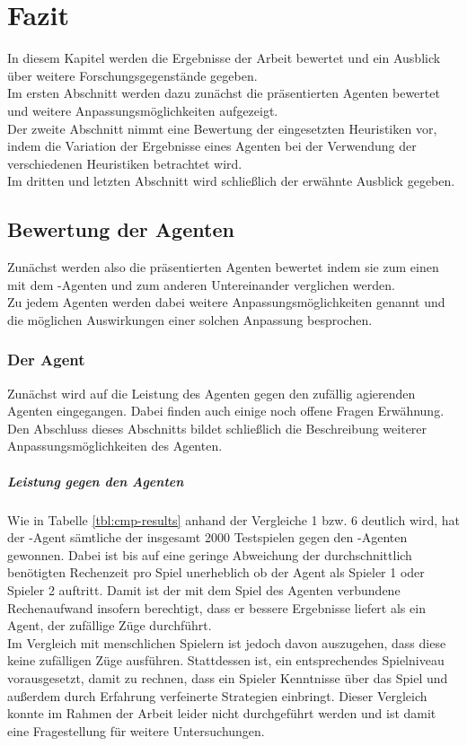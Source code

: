 \chapter{Fazit}
\label{Fazit}
\authormax
In diesem Kapitel werden die Ergebnisse der Arbeit bewertet und ein Ausblick über weitere Forschungsgegenstände gegeben.
\\Im ersten Abschnitt werden dazu zunächst die präsentierten Agenten bewertet und weitere Anpassungsmöglichkeiten aufgezeigt.
\\Der zweite Abschnitt nimmt eine Bewertung der eingesetzten Heuristiken vor, indem die Variation der Ergebnisse eines Agenten bei der Verwendung der verschiedenen Heuristiken betrachtet wird.
\\Im dritten und letzten Abschnitt wird schließlich der erwähnte Ausblick gegeben.   

\section{Bewertung der Agenten}
Zunächst werden also die präsentierten Agenten bewertet indem sie zum einen mit dem -Agenten und zum anderen Untereinander verglichen werden.
\\Zu jedem Agenten werden dabei weitere Anpassungsmöglichkeiten genannt und die möglichen Auswirkungen einer solchen Anpassung besprochen.
\subsection{Der Agent \mxZitat{\mc}}
\authormax
Zunächst wird auf die Leistung des Agenten \mxZitat{\mc} gegen den zufällig agierenden Agenten eingegangen. Dabei finden auch einige noch offene Fragen Erwähnung. Den Abschluss dieses Abschnitts bildet schließlich die Beschreibung weiterer Anpassungsmöglichkeiten des Agenten.  
\paragraph{Leistung gegen den Agenten }
Wie in Tabelle \ref{tbl:cmp-results} anhand der Vergleiche 1 bzw. 6 deutlich wird, hat der \mxZitat{\mc}-Agent sämtliche der insgesamt 2000 Testspielen gegen den -Agenten gewonnen. Dabei ist bis auf eine geringe Abweichung der durchschnittlich benötigten Rechenzeit pro Spiel unerheblich ob der Agent als Spieler 1 oder Spieler 2 auftritt. Damit ist der mit dem Spiel des Agenten verbundene Rechenaufwand insofern berechtigt, dass er bessere Ergebnisse liefert als ein Agent, der zufällige Züge durchführt.
\\Im Vergleich mit menschlichen Spielern ist jedoch davon auszugehen, dass diese keine zufälligen Züge ausführen. Stattdessen ist, ein entsprechendes Spielniveau vorausgesetzt, damit zu rechnen, dass ein Spieler Kenntnisse über das Spiel und außerdem durch Erfahrung verfeinerte Strategien einbringt. Dieser Vergleich konnte im Rahmen der Arbeit leider nicht durchgeführt werden und ist damit eine Fragestellung für weitere Untersuchungen.  

